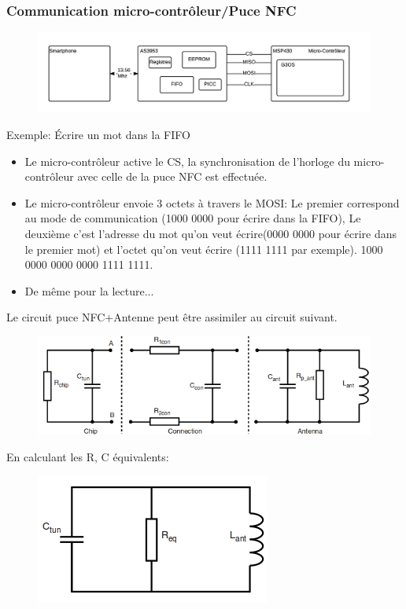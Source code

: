 \documentclass{beamer}
\begin{document}
\begin{frame}
\frametitle{Communication micro-contrôleur/Puce NFC}
\begin{figure}
\centering
\includegraphics[scale=0.5]{images/block-diagram.png}
\end{figure}
Exemple: Écrire un mot dans la FIFO
\begin{itemize}
\item Le micro-contrôleur active le CS, la synchronisation de l'horloge du micro-contrôleur avec celle de la puce NFC est effectuée.
\item Le micro-contrôleur envoie 3 octets à travers le MOSI: Le premier correspond au mode de communication (1000 0000 pour écrire dans la FIFO), Le deuxième c'est l'adresse du mot qu'on veut écrire(0000 0000 pour écrire dans le premier mot) et l'octet qu'on veut écrire (1111 1111 par exemple). 1000 0000 0000 0000 1111 1111.
\item De même pour la lecture...

\end{itemize}

\end{frame}

\begin{frame}

Le circuit puce NFC+Antenne peut être assimiler au circuit suivant.
\begin{figure}
\centering
\includegraphics[scale=0.4]{images/withPARA.png}
\end{figure}

En calculant les R, C équivalents:
\begin{figure}
\centering
\includegraphics[scale=0.4]{images/circuiteq.png}
\end{figure}
\end{frame}
\end{document}
